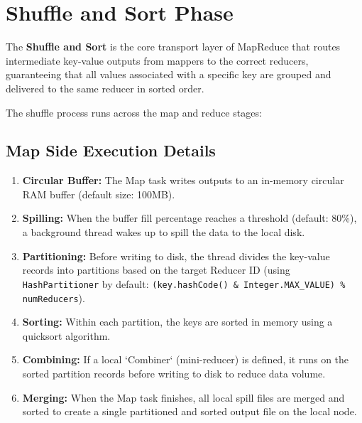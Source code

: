 \documentclass[12pt,a4paper]{article}
\begin{document}
\section{Shuffle and Sort Phase}

\begin{tcolorbox}[defbox, title={The Shuffle and Sort}]
  The \textbf{Shuffle and Sort} is the core transport layer of MapReduce that routes intermediate key-value outputs from mappers to the correct reducers, guaranteeing that all values associated with a specific key are grouped and delivered to the same reducer in sorted order.
\end{tcolorbox}

The shuffle process runs across the map and reduce stages:

\subsection{Map Side Execution Details}
\begin{enumerate}[leftmargin=*, itemsep=3pt]
  \item \textbf{Circular Buffer:} The Map task writes outputs to an in-memory circular RAM buffer (default size: 100MB).
  \item \textbf{Spilling:} When the buffer fill percentage reaches a threshold (default: 80\%), a background thread wakes up to spill the data to the local disk.
  \item \textbf{Partitioning:} Before writing to disk, the thread divides the key-value records into partitions based on the target Reducer ID (using \texttt{HashPartitioner} by default: \texttt{(key.hashCode() \& Integer.MAX\_VALUE) \% numReducers}).
  \item \textbf{Sorting:} Within each partition, the keys are sorted in memory using a quicksort algorithm.
  \item \textbf{Combining:} If a local `Combiner` (mini-reducer) is defined, it runs on the sorted partition records before writing to disk to reduce data volume.
  \item \textbf{Merging:} When the Map task finishes, all local spill files are merged and sorted to create a single partitioned and sorted output file on the local node.
\end{enumerate}
\end{document}
